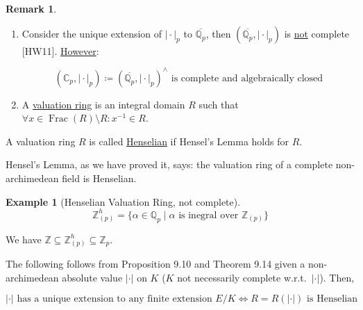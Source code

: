 \documentclass[openany]{amsbook}
\numberwithin{section}{chapter}
\theoremstyle{definition}
\newtheorem*{example}{Example}
\newtheorem*{remark}{Remark}
\begin{document}
\begin{remark}
    \begin{enumerate}[label=\arabic*)]
        \item Consider the unique extension of \(\vert \cdot \vert_p\) to \(\overline{\mathbb{Q}_p}\), then \((\overline{\mathbb{Q}_p}, \vert \cdot \vert _p )\) is \underline{not} complete [HW11]. \underline{However}:
        
        \[
            (\mathbb{C}_p, \vert \cdot \vert _p) \coloneqq (\overline{\mathbb{Q}_p}, \vert \cdot \vert _p )^\wedge \text{ is complete and algebraically closed} 
        \]

        \item A \underline{valuation ring} is an integral domain \(R\) such that \(\forall x\in \operatorname{Frac} (R) \setminus R: x ^{-1} \in R\).
    \end{enumerate} 
\end{remark}

A valuation ring \(R\) is called \underline{Henselian} if Hensel's Lemma holds for \(R\).

Hensel's Lemma, as we have proved it, says: the valuation ring of a complete non-archimedean field is Henselian.

\begin{example}
    [Henselian Valuation Ring, not complete]

    \[
        \mathbb{Z}_{(p)}^h = \{ \alpha \in \mathbb{Q}_p \mid \alpha \text{ is inegral over } \mathbb{Z}_{(p)} \} 
    \]

    We have \(\mathbb{Z} \subseteq \mathbb{Z}_{(p)}^h \subseteq \mathbb{Z}_p\).

\end{example}

The following follows from Proposition 9.10 and Theorem 9.14 given a non-archimedean absolute value \(\vert \cdot \vert\) on \(K\) (\(K\) not necessarily complete w.r.t.\ \(\vert \cdot \vert\)). Then,

\[
    \vert \cdot \vert \text{ has a unique extension to any finite extension } E / K \iff R = R(\vert \cdot \vert) \text{ is Henselian}
\]
\end{document}
